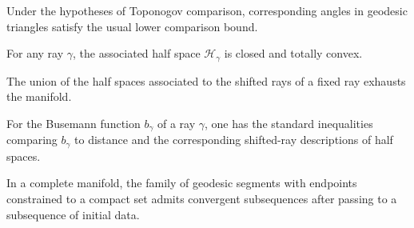 \begin{corollary}
\label{appb-cor-angle-comparison}


Under the hypotheses of Toponogov comparison, corresponding angles in geodesic triangles satisfy the usual lower comparison bound.
\end{corollary}

\begin{lemma}
\label{appb-lem-halfspace-totally-convex}


For any ray $\gamma$, the associated half space $\mathcal H_\gamma$ is closed and totally convex.
\end{lemma}

\begin{lemma}
\label{appb-lem-halfspace-exhaustion}


The union of the half spaces associated to the shifted rays of a fixed ray exhausts the manifold.
\end{lemma}

\begin{lemma}
\label{appb-lem-busemann-basic}


For the Busemann function $b_\gamma$ of a ray $\gamma$, one has the standard inequalities comparing $b_\gamma$ to distance and the corresponding shifted-ray descriptions of half spaces.
\end{lemma}

\begin{lemma}
\label{appb-lem-compactness-geodesic-segments}

In a complete manifold, the family of geodesic segments with endpoints constrained to a compact set admits convergent subsequences after passing to a subsequence of initial data.
\end{lemma}

